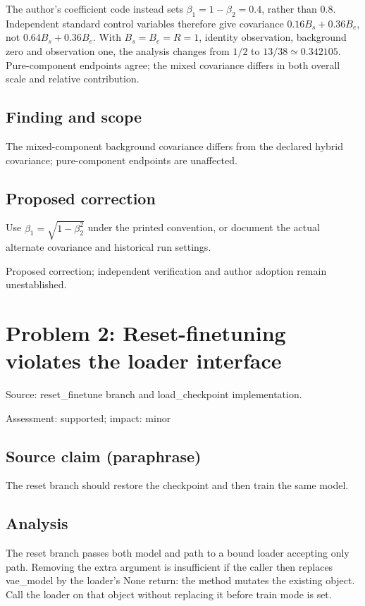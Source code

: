 \documentclass[11pt]{article}
\begin{document}
The author's coefficient code instead sets \(\beta_1=1-\beta_2=0.4\), rather than \(0.8\). Independent standard control variables therefore give covariance \(0.16B_s+0.36B_e\), not \(0.64B_s+0.36B_e\). With \(B_s=B_e=R=1\), identity observation, background zero and observation one, the analysis changes from \(1/2\) to \(13/38\simeq0.342105\). Pure-component endpoints agree; the mixed covariance differs in both overall scale and relative contribution.

\subsection*{Finding and scope}

The mixed-component background covariance differs from the declared hybrid covariance; pure-component endpoints are unaffected.

\subsection*{Proposed correction}

Use \(\beta_1=\sqrt{1-\beta_2^2}\) under the printed convention, or document the actual alternate covariance and historical run settings.

Proposed correction; independent verification and author adoption remain unestablished.

\section*{Problem 2: Reset-finetuning violates the loader interface}

Source: reset\_finetune branch and load\_checkpoint implementation.

Assessment: supported; impact: minor

\subsection*{Source claim (paraphrase)}

The reset branch should restore the checkpoint and then train the same model.

\subsection*{Analysis}

The reset branch passes both model and path to a bound loader accepting only path. Removing the extra argument is insufficient if the caller then replaces vae\_model by the loader's None return: the method mutates the existing object. Call the loader on that object without replacing it before train mode is set.
\end{document}
